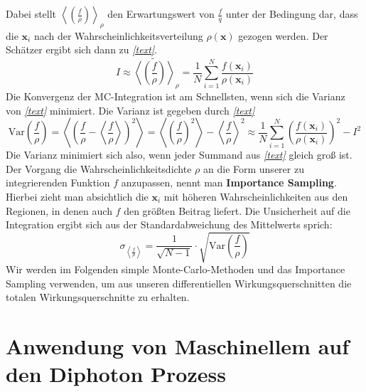 Dabei stellt $\left\langle \left(\frac{f}{\rho}\right) \right\rangle_{\rho}$  den Erwartungswert von $\frac{f}{q}$ unter der Bedingung dar, dass die $\mathbf{x}_i$ nach der Wahrscheinlichkeitsverteilung $\rho(\mathbf{x})$ gezogen werden. Der Schätzer ergibt sich dann zu \textit{\autoref{text}}.
\begin{equation}
I \approx \tilde{\left\langle \left(\frac{f}{\rho}\right) \right\rangle}_{\rho}  = \frac{1}{N}\sum_{i=1}^{N}\frac{f(\mathbf{x}_i)}{\rho(\mathbf{x}_i)}
\end{equation}
Die Konvergenz der MC-Integration ist am Schnellsten, wenn sich die Varianz von \textit{\autoref{text}} minimiert. Die Varianz ist gegeben durch \textit{\autoref{text}}
\begin{equation}
\text{Var}\left(\frac{f}{\rho}\right) = \left\langle\left(\frac{f}{\rho} - \left\langle \frac{f}{\rho}\right\rangle \right)^2 \right\rangle = \left\langle \left(\frac{f}{\rho}\right)^2 \right\rangle - \left\langle\frac{f}{\rho} \right\rangle^2 \approx \frac{1}{N} \sum_{i=1}^{N}\left(\frac{f(\mathbf{x}_i)}{\rho(\mathbf{x}_i)}\right)^2 - I^2
\end{equation}
Die Varianz minimiert sich also, wenn jeder Summand aus \textit{\autoref{text}} gleich groß ist. Der Vorgang die Wahrscheinlichkeitsdichte $\rho$ an die Form unserer zu integrierenden Funktion $f$ anzupassen, nennt man \textbf{Importance Sampling}. Hierbei zieht man absichtlich die $\mathbf{x}_i$ mit höheren Wahrscheinlichkeiten aus den Regionen, in denen auch $f$ den größten Beitrag liefert. Die Unsicherheit auf die Integration ergibt sich aus der Standardabweichung des Mittelwerts sprich:
\begin{equation}
\sigma_{\left\langle \frac{f}{\rho}\right\rangle} = \frac{1}{\sqrt{N-1}} \cdot \sqrt{\text{Var}\left(\frac{f}{\rho}\right)}
\end{equation}
Wir werden im Folgenden simple Monte-Carlo-Methoden und das Importance Sampling verwenden, um aus unseren differentiellen Wirkungsquerschnitten die totalen Wirkungsquerschnitte zu erhalten.   


\chapter{Anwendung von Maschinellem auf den Diphoton Prozess}
